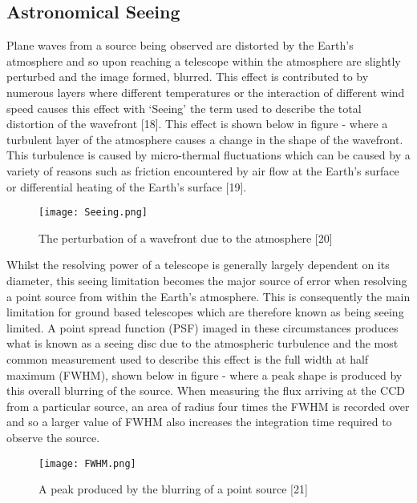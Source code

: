 \documentclass[pdf,color]{UoBnote}
\begin{document}
\subsection{Astronomical Seeing}
Plane waves from a source being observed are distorted by the Earth’s atmosphere and so upon reaching a telescope within the atmosphere are slightly perturbed and the image formed, blurred. This effect is contributed to by numerous layers where different temperatures or the interaction of different wind speed causes this effect with ‘Seeing’ the term used to describe the total distortion of the wavefront [18]. This effect is shown below in figure - where a turbulent layer of the atmosphere causes a change in the shape of the wavefront. This turbulence is caused by micro-thermal fluctuations which can be caused by a variety of reasons such as friction encountered by air flow at the Earth’s surface or differential heating of the Earth’s surface [19].\\
\newline
\begin{figure}[H]
\begin{center}
\texttt{[image: Seeing.png]}
\end{center}
\caption{The perturbation of a wavefront due to the atmosphere [20]}\label{fig:figure1}
\end{figure}

\noindent
Whilst the resolving power of a telescope is generally largely dependent on its diameter, this seeing limitation becomes the major source of error when resolving a point source from within the Earth’s atmosphere. This is consequently the main limitation for ground based telescopes which are therefore known as being seeing limited. A point spread function (PSF) imaged in these circumstances produces what is known as a seeing disc due to the atmospheric turbulence and the most common measurement used to describe this effect is the full width at half maximum (FWHM), shown below in figure - where a peak shape is produced by this overall blurring of the source. When measuring the flux arriving at the CCD from a particular source, an area of radius four times the FWHM is recorded over and so a larger value of FWHM also increases the integration time required to observe the source. \\
\newline
\begin{figure}[H]
\begin{center}
\texttt{[image: FWHM.png]}
\end{center}
\caption{A peak produced by the blurring of a point source [21]}\label{fig:figure1}
\end{figure}
\noindent
\end{document}

